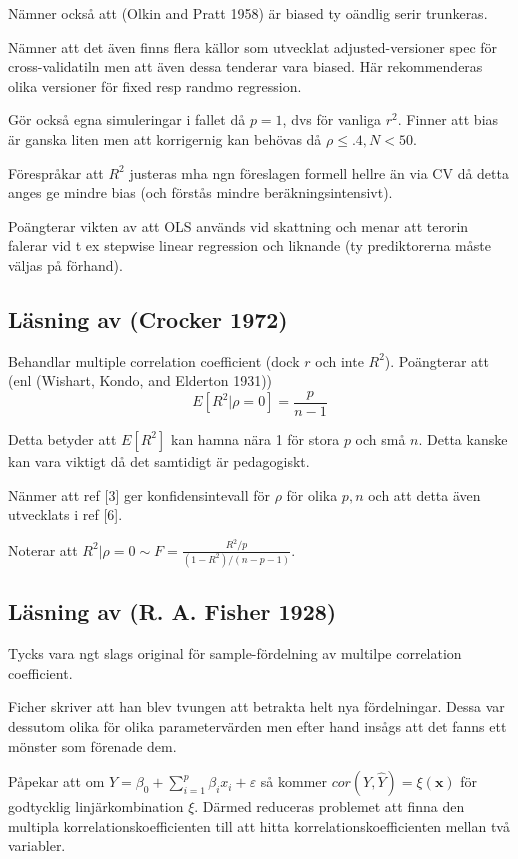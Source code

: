 \documentclass[]{article}
\begin{document}
Nämner också att (Olkin and Pratt 1958) är biased ty oändlig serir
trunkeras.

Nämner att det även finns flera källor som utvecklat adjusted-versioner
spec för cross-validatiln men att även dessa tenderar vara biased. Här
rekommenderas olika versioner för fixed resp randmo regression.

Gör också egna simuleringar i fallet då \(p = 1\), dvs för vanliga
\(r^2\). Finner att bias är ganska liten men att korrigernig kan behövas
då \(\rho \leq .4, N < 50\).

Förespråkar att \(R^2\) justeras mha ngn föreslagen formell hellre än
via CV då detta anges ge mindre bias (och förstås mindre
beräkningsintensivt).

Poängterar vikten av att OLS används vid skattning och menar att terorin
falerar vid t ex stepwise linear regression och liknande (ty
prediktorerna måste väljas på förhand).

\subsection{Läsning av (Crocker 1972)}\label{lasning-av-crocker1972}

Behandlar multiple correlation coefficient (dock \(r\) och inte
\(R^2\)). Poängterar att (enl (Wishart, Kondo, and Elderton 1931))
\[E[R^2|\rho = 0] = \frac{p}{n-1}\]

Detta betyder att \(E[R^2]\) kan hamna nära 1 för stora \(p\) och små
\(n\). Detta kanske kan vara viktigt då det samtidigt är pedagogiskt.

Nänmer att ref {[}3{]} ger konfidensintevall för \(\rho\) för olika
\(p, n\) och att detta även utvecklats i ref {[}6{]}.

Noterar att \(R^2|\rho = 0 \sim F = \frac{R^2/p}{(1-R^2)/(n-p-1)}\).

\subsection{Läsning av (R. A. Fisher 1928)}\label{lasning-av-fisher1928}

Tycks vara ngt slags original för sample-fördelning av multilpe
correlation coefficient.

Ficher skriver att han blev tvungen att betrakta helt nya fördelningar.
Dessa var dessutom olika för olika parametervärden men efter hand insågs
att det fanns ett mönster som förenade dem.

Påpekar att om
\(Y = \beta_0 + \sum_{i = 1}^p \beta_i x_i + \varepsilon\) så kommer
\(cor(Y, \hat{Y}) = \xi(\mathbf{x})\) för godtycklig linjärkombination
\(\xi\). Därmed reduceras problemet att finna den multipla
korrelationskoefficienten till att hitta korrelationskoefficienten
mellan två variabler.
\end{document}
